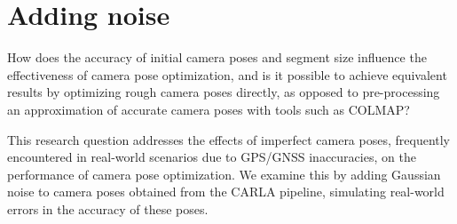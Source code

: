 \begin{comment}
The size of the images, or their resolution, has a complex impact on model performance. While higher resolution images contribute to higher fidelity renders, the metrics could suggest otherwise due to their increased sensitivity to minor differences in synthesized and ground-truth images. Hence, resolution can impact the quality of synthesized images and their metric scores, and it is crucial to align it with the number of frames for efficient coverage of input pixels.

Vehicle speed is a significant factor when capturing synthetic data, particularly due to the influence of motion blur and temporal artifacts on image quality. Faster vehicle speeds can lead to increased blur and distortion, making it challenging for the NeRF to learn the scene structure and appearance. Conversely, slower speeds provide clearer and more detailed images, improving the quality of the training data. Furthermore, slower speeds result in a larger dataset due to the increased number of images captured.

In conclusion, each of these factors—camera setup, capacity, number of frames, image size, and vehicle speed—has a unique and important influence on the quality of synthetic data captured for training NeRF models. Their careful consideration is essential for optimizing the performance of the resulting models.
\end{comment}








\section{Adding noise}
\begin{description}[leftmargin=!,labelwidth=\widthof{RQ 1:}]
\item[\textbf{RQ 2:}] How does the accuracy of initial camera poses and segment size influence the effectiveness of camera pose optimization, and is it possible to achieve equivalent results by optimizing rough camera poses directly, as opposed to pre-processing an approximation of accurate camera poses with tools such as COLMAP?
\end{description}

This research question addresses the effects of imperfect camera poses, frequently encountered in real-world scenarios due to GPS/GNSS inaccuracies, on the performance of camera pose optimization. We examine this by adding Gaussian noise to camera poses obtained from the CARLA pipeline, simulating real-world errors in the accuracy of these poses.

